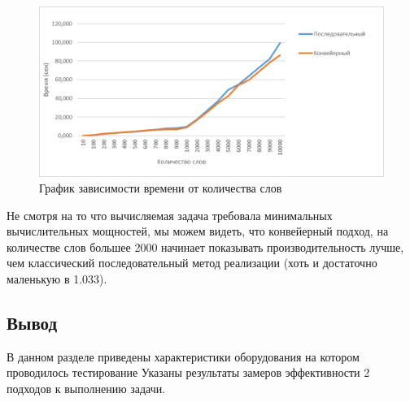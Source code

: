 \documentclass[../main.tex]{subfiles}
\begin{document}
	\begin{figure}[H]
		\centering
		\includegraphics[scale=0.5]{src/img/График}
		\caption{График зависимости времени от количества слов}
		\label{fig:graph}
	\end{figure}

	Не смотря на то что вычисляемая задача требовала минимальных вычислительных мощностей, мы можем видеть, что конвейерный подход, на количестве слов большее 2000 начинает показывать производительность лучше, чем классический последовательный метод реализации (хоть и достаточно маленькую в 1.033).
	
\subsection{Вывод}

	В данном разделе приведены характеристики оборудования на котором проводилось тестирование
	Указаны результаты замеров эффективности 2 подходов к выполнению задачи.
\end{document}
